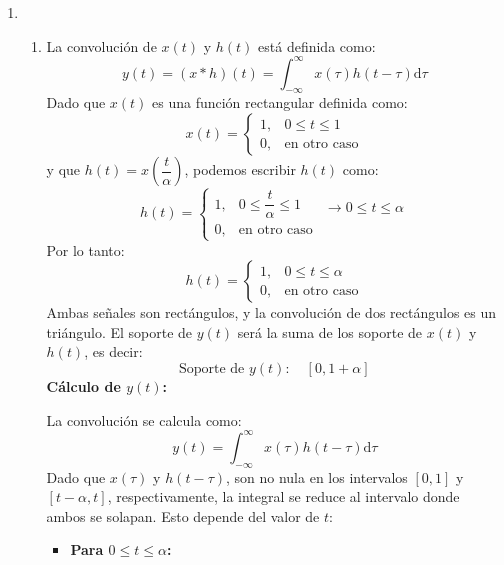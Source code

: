 \begin{enumerate}[label=\color{red}\textbf{\arabic*)}]
\begin{center}
    \end{center}
  \item {} 
  \begin{enumerate}[label=\color{red}\textbf{\alph*)}]
    \item {}

      La convolución de $x(t)$ y  $h(t)$ está definida como:  \[
      y(t)=(x\ast h)(t)=\int_{-\infty}^{\infty} x(\tau)h(t-\tau)\mathrm{d}\tau 
      \] 
      Dado que $x(t)$ es una función rectangular definida como:  \[
      x(t)=\begin{cases}
        1, & 0\le t\le 1\\
        0, & \text{en otro caso}
      \end{cases}
      \] 
      y que $h(t)=x\left( \dfrac{t}{\alpha} \right) $, podemos escribir $h(t)$ como:  \[
      h(t)=\begin{cases}
        1, & 0\le \dfrac{t}{\alpha}\le 1\\
        0, & \text{en otro caso}
        \end{cases} \begin{array}{l}
        \longrightarrow 0\le t\le \alpha\\
        \\
      \end{array}
      \] 
      Por lo tanto: \[
      h(t)=\begin{cases}
        1, & 0\le t\le \alpha\\
        0, & \text{en otro caso}
      \end{cases}
      \] 
      Ambas señales son rectángulos, y la convolución de dos rectángulos es un triángulo. El soporte de $y(t)$ será la suma de los soporte de  $x(t)$ y $h(t)$, es decir:  \[
        \text{Soporte de }y(t):\quad [0,1+\alpha]
      \] 
      \textbf{Cálculo de $y(t)$:} 

      La convolución se calcula como: $$y(t)=\int_{-\infty}^{\infty} x(\tau)h(t-\tau)\mathrm{d}\tau $$
      Dado que $x(\tau)$ y  $h(t-\tau)$, son no nula en los intervalos  $[0,1]$ y  $[t-\alpha,t]$, respectivamente, la integral se reduce al intervalo donde ambos se solapan. Esto depende del valor de $t$:
       \begin{itemize}[label=\textbullet]
        \item \textbf{Para $0\le t\le \alpha$:}


\end{itemize}
\end{enumerate}
\end{enumerate}

